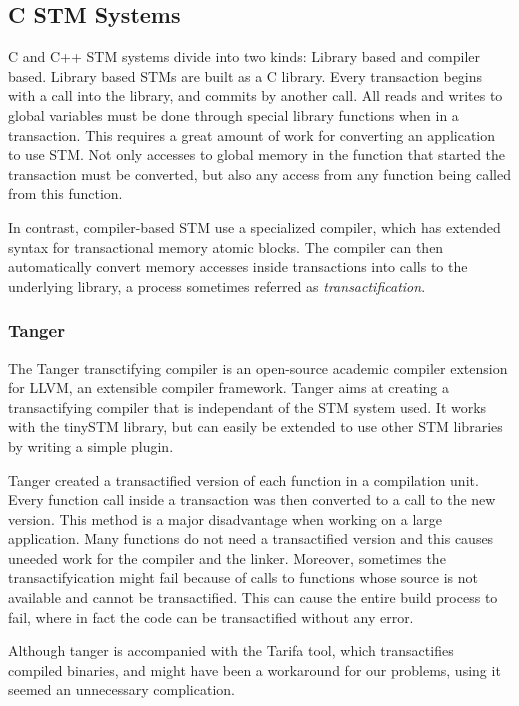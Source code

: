 \documentclass[preprint,natbib,11pt]{sigplanconf}
\begin{document}
\subsection{C STM Systems}
C and C++ STM systems divide into two kinds: Library based and compiler based.
Library based STMs are built as a C library. Every transaction begins with a
call into the library, and commits by another call. All reads and writes to
global variables must be done through special library functions when in a
transaction. This requires a great amount of work for converting an application
to use STM. Not only accesses to global memory in the function that started the
transaction must be converted, but also any access from any function being
called from this function. 

In contrast, compiler-based STM use a specialized compiler, which has extended
syntax for transactional memory atomic blocks. The compiler can then
automatically convert memory accesses inside transactions into calls to the
underlying library, a process sometimes referred as \emph{transactification}. 

\subsubsection{Tanger}
The Tanger\cite{felber2007tanger} transctifying compiler is an open-source academic
compiler extension for LLVM\cite{LLVM:CGO04}, an extensible compiler framework.
Tanger aims at creating a transactifying compiler that is independant of the STM
system used. It works with the tinySTM\cite{felber2008tinystm} library, but can
easily be extended to use other STM libraries by writing a simple plugin.

Tanger created a transactified version of each function in a compilation unit.
Every function call inside a transaction was then converted to a call to the new
version. This method is a major disadvantage when working on a large
application. Many functions do not need a transactified version and this causes
uneeded work for the compiler and the linker. Moreover, sometimes the
transactifyication might fail because of calls to functions whose source is not
available and cannot be transactified. This can cause the entire build process
to fail, where in fact the code can be transactified without any error.

Although tanger is accompanied with the Tarifa tool, which transactifies
compiled binaries, and might have been a workaround for our problems, using it
seemed an unnecessary complication.
\end{document}
